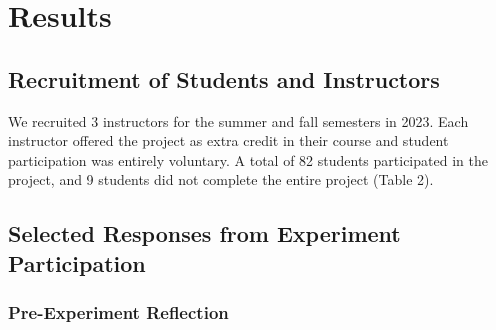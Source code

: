 \documentclass[
  12pt,
]{article}
\providecommand{\DIFdel}[1]{} %
\providecommand{\DIFadd}[1]{{\protect\color{blue} \sf #1}} %
\providecommand{\DIFdel}[1]{{\protect\color{red} [..\footnote{removed: #1} ]}} %
\providecommand{\DIFaddbegin}{} %
\providecommand{\DIFaddend}{} %
\providecommand{\DIFdelbegin}{} %
\providecommand{\DIFdelend}{} %
\newcommand{\DIFscaledelfig}{0.5}
\newlength{\DIFdelgraphicswidth} %
\newlength{\DIFdelgraphicsheight} %
\newcommand{\DIFaddincludegraphics}[2][]{{\color{blue}\fbox{\DIFOincludegraphics[#1]{#2}}}} %
\newcommand{\DIFdelincludegraphics}[2][]{%
\sbox{\DIFdelgraphicsbox}{\DIFOincludegraphics[#1]{#2}}%
\settoboxwidth{\DIFdelgraphicswidth}{\DIFdelgraphicsbox} %
\settoboxtotalheight{\DIFdelgraphicsheight}{\DIFdelgraphicsbox} %
\scalebox{\DIFscaledelfig}{%
\parbox[b]{\DIFdelgraphicswidth}{\usebox{\DIFdelgraphicsbox}\\[-\baselineskip] \rule{\DIFdelgraphicswidth}{0em}}\llap{\resizebox{\DIFdelgraphicswidth}{\DIFdelgraphicsheight}{%
\setlength{\unitlength}{\DIFdelgraphicswidth}%
\begin{picture}(1,1)%
\thicklines\linethickness{2pt} %
{\color[rgb]{1,0,0}\put(0,0){\framebox(1,1){}}}%
{\color[rgb]{1,0,0}\put(0,0){\line( 1,1){1}}}%
{\color[rgb]{1,0,0}\put(0,1){\line(1,-1){1}}}%
\end{picture}%
}\hspace*{3pt}}} %
} %
\DeclareRobustCommand{\DIFaddbegin}{\DIFOaddbegin \let\includegraphics\DIFaddincludegraphics} %
\DeclareRobustCommand{\DIFaddend}{\DIFOaddend \let\includegraphics\DIFOincludegraphics} %
\DeclareRobustCommand{\DIFdelbegin}{\DIFOdelbegin \let\includegraphics\DIFdelincludegraphics} %
\DeclareRobustCommand{\DIFdelend}{\DIFOaddend \let\includegraphics\DIFOincludegraphics} %
\begin{document}
\section{\DIFdel{Figure Legends}}%
\addtocounter{section}{-1}%

\DIFdel{Figure 1: Visual display of the experimental design for students who
participated in the 3D bar charts experiment. Kits of graphs were
created by first choosing five ratios from nine available options (1).
Each ratio then uses all graph types, with the exception of the
3D-printed graphs for online students (2). Finally, all graphs were
randomly assigned to have the marked bars as adjacent or separated (3).
}%

\DIFdelend \section{Results}\label{results}

\subsection{Recruitment of Students and
Instructors}\label{recruitment-of-students-and-instructors}

We recruited 3 instructors for \DIFaddbegin \DIFadd{the }\DIFaddend summer and fall semesters in 2023.
Each instructor offered the project as extra credit in their course and
student participation was entirely voluntary. A total of 82 students
participated in the project, and 9 students did not complete the \DIFdelbegin \DIFdel{project
completely }\DIFdelend \DIFaddbegin \DIFadd{entire
project }\DIFaddend (Table 2).

\subsection{Selected Responses from Experiment
Participation}\label{selected-responses-from-experiment-participation}

\subsubsection{Pre-Experiment
Reflection}\label{pre-experiment-reflection}
\end{document}
